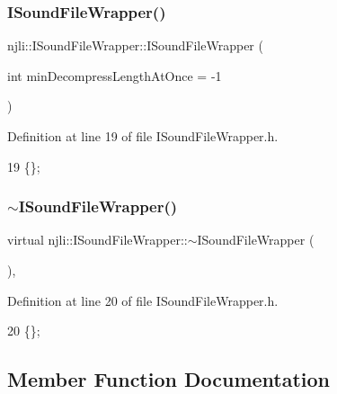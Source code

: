 \subsubsection{\texorpdfstring{I\+Sound\+File\+Wrapper()}{ISoundFileWrapper()}}
{\footnotesize\ttfamily njli\+::\+I\+Sound\+File\+Wrapper\+::\+I\+Sound\+File\+Wrapper (\begin{DoxyParamCaption}\item[{int}]{min\+Decompress\+Length\+At\+Once = {\ttfamily -\/1} }\end{DoxyParamCaption})\hspace{0.3cm}{\ttfamily [inline]}}



Definition at line 19 of file I\+Sound\+File\+Wrapper.\+h.


\begin{DoxyCode}
19 \{\};
\end{DoxyCode}
\mbox{\label{classnjli_1_1_i_sound_file_wrapper_a1d45f4bcf0e8229bc57907f22ce01ab7}} 
\subsubsection{\texorpdfstring{$\sim$\+I\+Sound\+File\+Wrapper()}{~ISoundFileWrapper()}}
{\footnotesize\ttfamily virtual njli\+::\+I\+Sound\+File\+Wrapper\+::$\sim$\+I\+Sound\+File\+Wrapper (\begin{DoxyParamCaption}{ }\end{DoxyParamCaption})\hspace{0.3cm}{\ttfamily [inline]}, {\ttfamily [virtual]}}



Definition at line 20 of file I\+Sound\+File\+Wrapper.\+h.


\begin{DoxyCode}
20 \{\};
\end{DoxyCode}


\subsection{Member Function Documentation}
\mbox{\label{classnjli_1_1_i_sound_file_wrapper_a9b338a5bbcb5d07acdebce1efab332c5}} 
